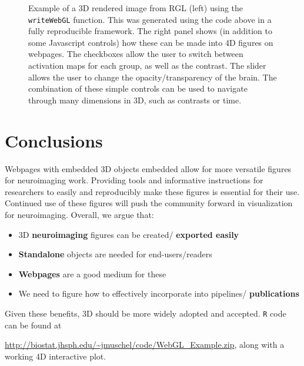 \documentclass[final]{beamer}\usepackage{graphicx, color}
\begin{document}
\begin{frame}[fragile]
\begin{multicols}{2}
\begin{figure}
\begin{minipage}[t]{3.5in}
  \end{minipage} \hfill
  \begin{minipage}[b]{7in}
    \caption{
		Example of a 3D rendered image from RGL (left) using the \texttt{writeWebGL} function.  This was generated using the code above in a fully reproducible framework.  The right panel shows (in addition to some Javascript controls) how these can be made into 4D figures on webpages.  The checkboxes allow the user to switch between activation maps for each group, as well as the contrast.  The slider allows the user to change the opacity/transparency of the brain.  The combination of these simple controls can be used to navigate through many dimensions in 3D, such as contrasts or time.   }   \label{fig:fig2}	
 \end{minipage}
\end{figure}
 



\section{Conclusions}

Webpages with embedded 3D objects embedded allow for more versatile figures for neuroimaging work. Providing tools and informative instructions for researchers to easily and reproducibly make these figures is essential for their use.  Continued use of these figures will push the community forward in visualization for neuroimaging.  Overall, we argue that:

\begin{itemize}

\item 3D  {\color{red} \bf neuroimaging} figures can be created/{\color{red} \bf exported easily} 
 
\item {\color{red} \bf Standalone}  objects are needed for end-users/readers
 
\item {\color{red} \bf Webpages}  are a good medium for these
 
\item We need to figure how to effectively incorporate into pipelines/{\color{red} \bf publications} 

\end{itemize}
Given these benefits, 3D should be more widely adopted and accepted. \texttt{R} code can be found at 

{\large \color{red} \url{http://biostat.jhsph.edu/~jmuschel/code/WebGL_Example.zip}}, along with a working 4D interactive plot.


\end{multicols}
\end{frame}
\end{document}
